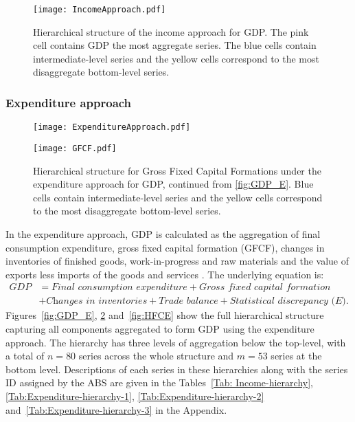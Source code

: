 {\begin{figure}[!h]
	\centering
	\texttt{[image: IncomeApproach.pdf]}
	\caption{Hierarchical structure of the income approach for GDP\@. The pink cell contains GDP the most aggregate series. The blue cells contain intermediate-level series and the yellow cells correspond to the most disaggregate bottom-level series.}\label{fig:GDP_I}
\end{figure}

\subsubsection*{Expenditure approach}

\begin{figure}
	\centering	\texttt{[image: ExpenditureApproach.pdf]}
	\caption{Hierarchical structure of the expenditure approach for GDP\@. The pink cell contains GDP, the most aggregate series. The blue and purple cells contain intermediate-level series with the series in the purple cells further disaggregated in Figures~\ref{fig:GFCF} and~\ref{fig:HFCE}. The yellow cells contain the most disaggregate bottom-level series.}\label{fig:GDP_E}
	\centering
	\texttt{[image: GFCF.pdf]}
	\caption{Hierarchical structure for Gross Fixed Capital Formations under the expenditure approach for GDP, continued from \ref{fig:GDP_E}. Blue cells contain intermediate-level series and the yellow cells correspond to the most disaggregate bottom-level series.}\label{fig:GFCF}
\end{figure}

In the expenditure approach, GDP is calculated as the aggregation of final consumption expenditure, gross fixed capital formation (GFCF), changes in inventories of finished goods, work-in-progress and raw materials and the value of exports less imports of the goods and services \citep{ABS2015}. The underlying equation is:
\begin{align*}
	\textit{GDP}
	 & = \textit{Final consumption expenditure}
     + \textit{Gross fixed capital formation} \\
	 & + \textit{Changes in inventories}
     + \textit{Trade balance}
     + \textit{Statistical discrepancy (E)}.
\end{align*}
Figures~\ref{fig:GDP_E}, \ref{fig:GFCF} and~\ref{fig:HFCE} show the full hierarchical structure capturing all components aggregated to form GDP using the expenditure approach. The hierarchy has three levels of aggregation below the top-level, with a total of $n=80$ series across the whole structure and $m=53$ series at the bottom level. Descriptions of each series in these hierarchies along with the series ID assigned by the ABS are given in the Tables~\ref{Tab: Income-hierarchy}, \ref{Tab:Expenditure-hierarchy-1}, \ref{Tab:Expenditure-hierarchy-2} and~\ref{Tab:Expenditure-hierarchy-3} in the Appendix.

}
